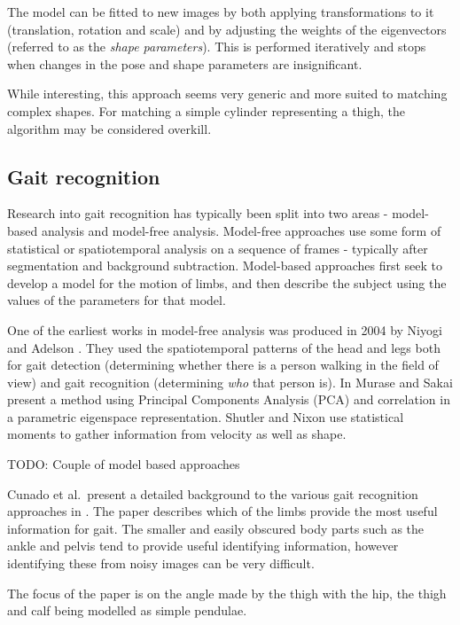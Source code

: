 The model can be fitted to new images by both applying transformations to it (translation, rotation and scale) and by adjusting the weights of the eigenvectors (referred to as the \emph{shape parameters}).
This is performed iteratively and stops when changes in the pose and shape parameters are insignificant.

While interesting, this approach seems very generic and more suited to matching complex shapes.
For matching a simple cylinder representing a thigh, the algorithm may be considered overkill.

\subsection{Gait recognition}

Research into gait recognition has typically been split into two areas - model-based analysis and model-free analysis.
Model-free approaches use some form of statistical or spatiotemporal analysis on a sequence of frames - typically after segmentation and background subtraction.
Model-based approaches first seek to develop a model for the motion of limbs, and then describe the subject using the values of the parameters for that model.

One of the earliest works in model-free analysis was produced in 2004 by Niyogi and Adelson \cite{XYT}.
They used the spatiotemporal patterns of the head and legs both for gait detection (determining whether there is a person walking in the field of view) and gait recognition (determining \emph{who} that person is).
In \cite{EigenRecognition} Murase and Sakai present a method using Principal Components Analysis (PCA) and correlation in a parametric eigenspace representation.
Shutler and Nixon \cite{ZernikeMoments} use statistical moments to gather information from velocity as well as shape.

\bigskip
\noindent TODO: Couple of model based approaches

\bigskip
\noindent Cunado et al.\ present a detailed background to the various gait recognition approaches in \cite{GaitModels}.
The paper describes which of the limbs provide the most useful information for gait.
The smaller and easily obscured body parts such as the ankle and pelvis tend to provide useful identifying information, however identifying these from noisy images can be very difficult.

The focus of the paper is on the angle made by the thigh with the hip, the thigh and calf being modelled as simple pendulae.

